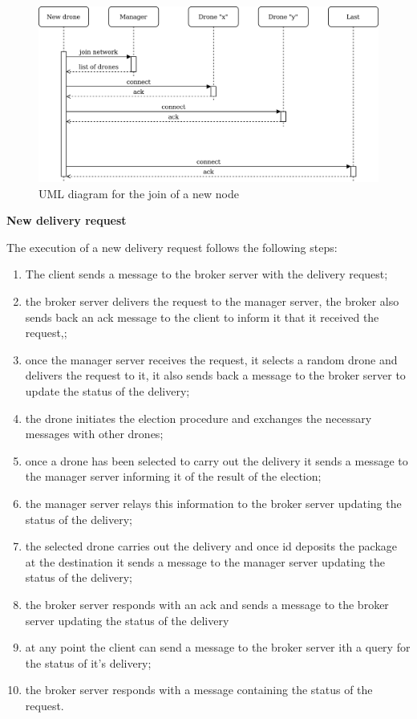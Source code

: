 \documentclass[a4paper, oneside]{memoir}
\begin{document}
\begin{figure}[h!]
	\centering
	\includegraphics[width=\linewidth]{New-drone}
	\caption{UML diagram for the join of a new node }
\end{figure}


\textbf{New delivery request}

The execution of a new delivery request follows the following steps:
\begin{enumerate}
\item The client sends a message to the broker server with the delivery request;
\item the broker server delivers the request to the manager server, the broker also sends back an ack message to the client to inform it that it received the request,;
\item once the manager server receives the request, it selects a random drone and delivers the request to it, it also sends back a message to the broker server to update the status of the delivery;
\item the drone initiates the election procedure and exchanges the necessary messages with other drones;
\item once a drone has been selected to carry out the delivery it sends a message to the manager server informing it of the result of the election;
\item the manager server relays this information to the broker server updating the status of the delivery;
\item the selected drone carries out the delivery and once id deposits the package at the destination it sends a message to the manager server updating the status of the delivery;
\item the broker server responds with an ack and sends a message to the broker server updating the status of the delivery
\item at any point the client can send a message to the broker server ith a query for the status of it's delivery;
\item the broker server responds with a message containing the status of the request.
\end{enumerate}
\end{document}
